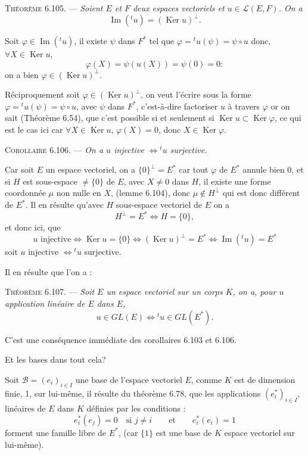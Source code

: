 \medskip\noindent\textsc{Théorème 6.105.} --- \emph{Soient $E$ et $F$ deux espaces vectoriels et $u\in\mathcal L(E,F)$. On a
\[
\operatorname{Im}({}^tu)=(\operatorname{Ker} u)^\perp.
\]}

Soit $\varphi\in\operatorname{Im}({}^tu)$, il existe $\psi$ dans $F^*$ tel que $\varphi={}^tu(\psi)=\psi\circ u$ donc, $\forall X\in\operatorname{Ker} u$,
\[
\varphi(X)=\psi(u(X))=\psi(0)=0:
\]
on a bien $\varphi\in(\operatorname{Ker} u)^\perp$.

Réciproquement soit $\varphi\in(\operatorname{Ker} u)^\perp$, on veut l'écrire sous la forme $\varphi={}^tu(\psi)=\psi\circ u$, avec $\psi$ dans $F^*$, c'est-à-dire factoriser $u$ à travers $\varphi$ or on sait (Théorème 6.54), que c'est possible si et seulement si $\operatorname{Ker} u\subset\operatorname{Ker}\varphi$, ce qui est le cas ici car $\forall X\in\operatorname{Ker} u$, $\varphi(X)=0$, donc $X\in\operatorname{Ker}\varphi$. \bookend

\medskip\noindent\textsc{Corollaire 6.106.} --- \emph{On a $u$ injective $\Longleftrightarrow{}^tu$ surjective.}

Car soit $E$ un espace vectoriel, on a $\{0\}^\perp=E^*$ car tout $\varphi$ de $E^*$ annule bien 0, et si $H$ est sous-espace $\ne\{0\}$ de $E$, avec $X\ne0$ dans $H$, il existe une forme coordonnée $\mu$ non nulle en $X$, (lemme 6.104), donc $\mu\notin H^\perp$ qui est donc différent de $E^*$. Il en résulte qu'avec $H$ sous-espace vectoriel de $E$ on a
\[
H^\perp=E^*\Longleftrightarrow H=\{0\},
\]
et donc ici, que
\[
u\text{ injective}\Longleftrightarrow\operatorname{Ker} u=\{0\}\Longleftrightarrow(\operatorname{Ker} u)^\perp=E^*
\Longleftrightarrow\operatorname{Im}({}^tu)=E^*
\]
soit $u$ injective $\Longleftrightarrow{}^tu$ surjective. \bookend

Il en résulte que l'on a :

\medskip\noindent\textsc{Théorème 6.107.} --- \emph{Soit $E$ un espace vectoriel sur un corps $K$, on a, pour $u$ application linéaire de $E$ dans $E$,
\[
u\in GL(E)\Longleftrightarrow{}^tu\in GL(E^*).
\]}

C'est une conséquence immédiate des corollaires 6.103 et 6.106. \bookend

Et les bases dans tout cela?

Soit $\mathcal B=(e_i)_{i\in I}$ une base de l'espace vectoriel $E$, comme $K$ est de dimension finie, 1, sur lui-même, il résulte du théorème 6.78, que les applications $(e_i^*)_{i\in I}$, linéaires de $E$ dans $K$ définies par les conditions :
\[
e_i^*(e_j)=0\quad\text{si }j\ne i\qquad\text{et}\qquad e_i^*(e_i)=1
\]
forment une famille libre de $E^*$, (car $\{1\}$ est une base de $K$ espace vectoriel sur lui-même).


